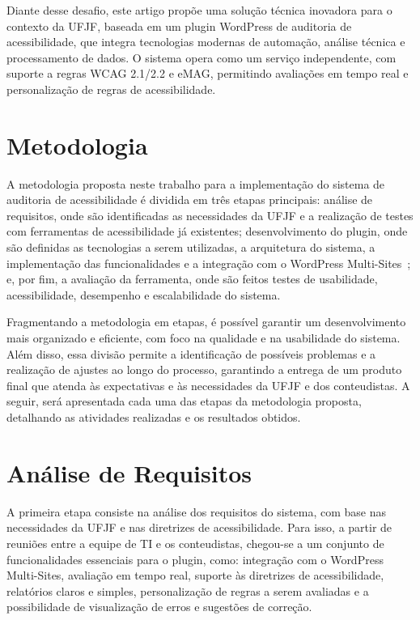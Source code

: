 \documentclass[
    12pt,
    a4paper,
    oneside,
    brazil,
    english
]{article}
\begin{document}
Diante desse desafio, este artigo propõe uma solução técnica inovadora
para o contexto da UFJF, baseada em um plugin WordPress de auditoria
de acessibilidade, que integra tecnologias modernas de automação,
análise técnica e processamento de dados. O sistema opera como um serviço
independente, com suporte a regras WCAG 2.1/2.2 e eMAG, permitindo
avaliações em tempo real e personalização de regras de acessibilidade.

\section*{Metodologia}\label{sec:metodologia}
A metodologia proposta neste trabalho
para a implementação do sistema de auditoria de acessibilidade é dividida
em três etapas principais: análise de requisitos, onde são identificadas as
necessidades da UFJF e a realização de testes com ferramentas de acessibilidade já
existentes; desenvolvimento do plugin, onde são definidas as tecnologias a serem
utilizadas, a arquitetura do sistema, a implementação das funcionalidades e a
integração com o WordPress Multi-Sites~\cite{wp-ms}; e, por fim,
a avaliação da ferramenta,
onde são feitos testes de usabilidade, acessibilidade, desempenho e
escalabilidade do sistema.

Fragmentando a metodologia em etapas, é possível garantir um desenvolvimento
mais organizado e eficiente, com foco na qualidade e na usabilidade do sistema.
Além disso, essa divisão permite a identificação de possíveis problemas
e a realização de ajustes ao longo do processo, garantindo a entrega de um
produto final que atenda às expectativas e às necessidades da UFJF e dos
conteudistas. A seguir, será apresentada cada uma das etapas da metodologia
proposta, detalhando as atividades realizadas e os resultados obtidos.

\section*{Análise de Requisitos}
A primeira etapa consiste na análise dos requisitos do sistema, com base nas
necessidades da UFJF e nas diretrizes de acessibilidade. Para isso, a partir
de reuniões entre a equipe de TI e os conteudistas, chegou-se a um conjunto de
funcionalidades essenciais para o plugin, como: integração com o WordPress
Multi-Sites, avaliação em tempo real, suporte às diretrizes de acessibilidade,
relatórios claros e simples, personalização de regras a serem avaliadas e a
possibilidade de visualização de erros e sugestões de correção.
\end{document}

